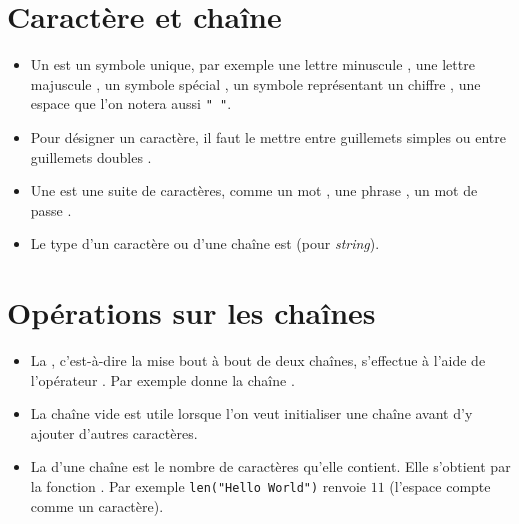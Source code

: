 \documentclass[12pt,class=report,crop=false]{standalone}
\begin{document}

\section*{Caractère et chaîne}


\begin{itemize}
  \item Un  est un symbole unique, par exemple une lettre minuscule , une lettre majuscule , un symbole spécial , un symbole représentant un chiffre , une espace  que l'on notera aussi \lstinline[showstringspaces=true]!" "!.
  
  \bigskip
  
  \item 
Pour désigner un caractère, il faut le mettre entre guillemets simples  ou entre guillemets doubles .

    \bigskip
    
  \item Une  est une suite de caractères, comme un mot , une phrase , un mot de passe \codeinline{"N[w5ms\}e!"}.
  
    \bigskip
  
  \item Le type d'un caractère ou d'une chaîne est  (pour \emph{string}).
  

\end{itemize}



\newpage

\section*{Opérations sur les chaînes}


\begin{itemize}
  \item La , c'est-à-dire la mise bout à bout de deux chaînes, s'effectue à l'aide de l'opérateur \codeinline{+}. Par exemple  donne la chaîne .
 
   \bigskip
 
  \item La chaîne vide  est utile lorsque l'on veut initialiser une chaîne avant d'y ajouter d'autres caractères.
  
    \bigskip
  
  \item La  d'une chaîne est le nombre de caractères qu'elle contient. Elle s'obtient par la fonction .
  Par exemple \lstinline[showstringspaces=true]!len("Hello World")! renvoie $11$ (l'espace compte comme un caractère).
\end{itemize}  
\end{document}
